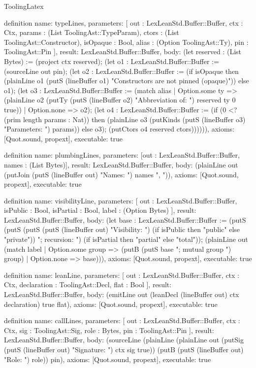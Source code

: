 \begin{lexlean}{ToolingLatex}
\begin{semanticmodule}
definition{
  name: typeLines,
  parameters: [
    out : LexLeanStd.Buffer::Buffer,
    ctx : Ctx,
    params : (List ToolingAst::TypeParam),
    ctors : (List ToolingAst::Constructor),
    isOpaque : Bool,
    alias : (Option ToolingAst::Ty),
    pin : ToolingAst::Pin
  ],
  result: LexLeanStd.Buffer::Buffer,
  body: (let reserved : (List Bytes) := (project ctx reserved); (let o1 : LexLeanStd.Buffer::Buffer := (sourceLine out pin); (let o2 : LexLeanStd.Buffer::Buffer := (if isOpaque then (plainLine o1 (putS (lineBuffer o1) "Constructors are not pinned (opaque)")) else o1); (let o3 : LexLeanStd.Buffer::Buffer := (match alias
    | Option.some ty => (plainLine o2 (putTy (putS (lineBuffer o2) "Abbreviation of: ") reserved ty 0 true))
    | Option.none => o2); (let o4 : LexLeanStd.Buffer::Buffer := (if (0 <? (prim length params : Nat)) then (plainLine o3 (putKinds (putS (lineBuffer o3) "Parameters: ") params)) else o3); (putCtors o4 reserved ctors)))))),
  axioms: [Quot.sound, propext],
  executable: true
}

definition{
  name: plumbingLines,
  parameters: [out : LexLeanStd.Buffer::Buffer, names : (List Bytes)],
  result: LexLeanStd.Buffer::Buffer,
  body: (plainLine out (putJoin (putS (lineBuffer out) "Names: ") names ", ")),
  axioms: [Quot.sound, propext],
  executable: true
}

definition{
  name: visibilityLine,
  parameters: [
    out : LexLeanStd.Buffer::Buffer,
    isPublic : Bool,
    isPartial : Bool,
    label : (Option Bytes)
  ],
  result: LexLeanStd.Buffer::Buffer,
  body: (let base : LexLeanStd.Buffer::Buffer := (putS (putS (putS (putS (lineBuffer out) "Visibility: ") (if isPublic then "public" else "private")) "; recursion: ") (if isPartial then "partial" else "total")); (plainLine out (match label
    | Option.some group => (putB (putS base "; mutual group ") group)
    | Option.none => base))),
  axioms: [Quot.sound, propext],
  executable: true
}

definition{
  name: leanLine,
  parameters: [
    out : LexLeanStd.Buffer::Buffer,
    ctx : Ctx,
    declaration : ToolingAst::Decl,
    flat : Bool
  ],
  result: LexLeanStd.Buffer::Buffer,
  body: (emitLine out (leanDecl (lineBuffer out) ctx declaration) true flat),
  axioms: [Quot.sound, propext],
  executable: true
}

definition{
  name: callLines,
  parameters: [
    out : LexLeanStd.Buffer::Buffer,
    ctx : Ctx,
    sig : ToolingAst::Sig,
    role : Bytes,
    pin : ToolingAst::Pin
  ],
  result: LexLeanStd.Buffer::Buffer,
  body: (sourceLine (plainLine (plainLine out (putSig (putS (lineBuffer out) "Signature: ") ctx sig true)) (putB (putS (lineBuffer out) "Role: ") role)) pin),
  axioms: [Quot.sound, propext],
  executable: true
}


\end{semanticmodule}
\end{lexlean}
